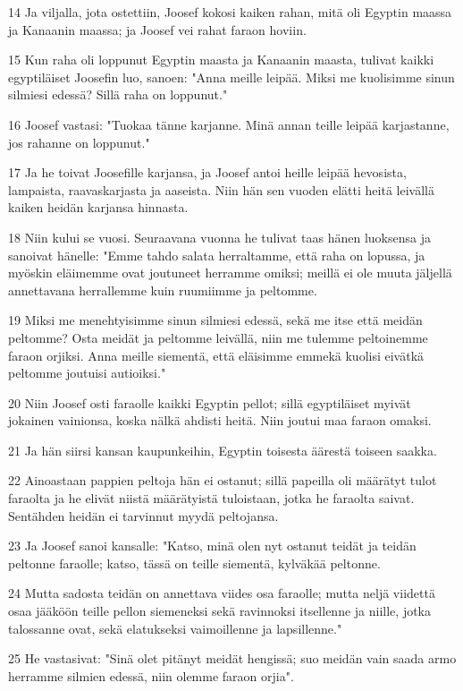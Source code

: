 \par 14 Ja viljalla, jota ostettiin, Joosef kokosi kaiken rahan, mitä oli Egyptin maassa ja Kanaanin maassa; ja Joosef vei rahat faraon hoviin.
\par 15 Kun raha oli loppunut Egyptin maasta ja Kanaanin maasta, tulivat kaikki egyptiläiset Joosefin luo, sanoen: "Anna meille leipää. Miksi me kuolisimme sinun silmiesi edessä? Sillä raha on loppunut."
\par 16 Joosef vastasi: "Tuokaa tänne karjanne. Minä annan teille leipää karjastanne, jos rahanne on loppunut."
\par 17 Ja he toivat Joosefille karjansa, ja Joosef antoi heille leipää hevosista, lampaista, raavaskarjasta ja aaseista. Niin hän sen vuoden elätti heitä leivällä kaiken heidän karjansa hinnasta.
\par 18 Niin kului se vuosi. Seuraavana vuonna he tulivat taas hänen luoksensa ja sanoivat hänelle: "Emme tahdo salata herraltamme, että raha on lopussa, ja myöskin eläimemme ovat joutuneet herramme omiksi; meillä ei ole muuta jäljellä annettavana herrallemme kuin ruumiimme ja peltomme.
\par 19 Miksi me menehtyisimme sinun silmiesi edessä, sekä me itse että meidän peltomme? Osta meidät ja peltomme leivällä, niin me tulemme peltoinemme faraon orjiksi. Anna meille siementä, että eläisimme emmekä kuolisi eivätkä peltomme joutuisi autioiksi."
\par 20 Niin Joosef osti faraolle kaikki Egyptin pellot; sillä egyptiläiset myivät jokainen vainionsa, koska nälkä ahdisti heitä. Niin joutui maa faraon omaksi.
\par 21 Ja hän siirsi kansan kaupunkeihin, Egyptin toisesta äärestä toiseen saakka.
\par 22 Ainoastaan pappien peltoja hän ei ostanut; sillä papeilla oli määrätyt tulot faraolta ja he elivät niistä määrätyistä tuloistaan, jotka he faraolta saivat. Sentähden heidän ei tarvinnut myydä peltojansa.
\par 23 Ja Joosef sanoi kansalle: "Katso, minä olen nyt ostanut teidät ja teidän peltonne faraolle; katso, tässä on teille siementä, kylväkää peltonne.
\par 24 Mutta sadosta teidän on annettava viides osa faraolle; mutta neljä viidettä osaa jääköön teille pellon siemeneksi sekä ravinnoksi itsellenne ja niille, jotka talossanne ovat, sekä elatukseksi vaimoillenne ja lapsillenne."
\par 25 He vastasivat: "Sinä olet pitänyt meidät hengissä; suo meidän vain saada armo herramme silmien edessä, niin olemme faraon orjia".

